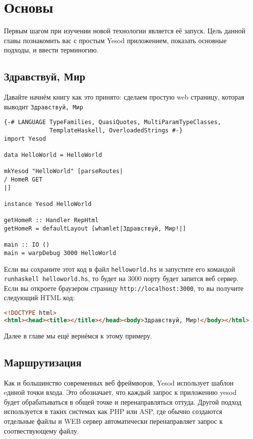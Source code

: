 \section{Основы}

Первым шагом при изучении новой технологии является её запуск. Цель данной главы 
познакомить вас с простым Yesod приложением, показать основные подходы, и ввести
терминогию.

\subsection{Здравствуй, Мир}

Давайте начнём книгу как это принято: сделаем простую web страницу, которая выводит
\texttt{Здравствуй, Мир}

\begin{lstlisting}
{-# LANGUAGE TypeFamilies, QuasiQuotes, MultiParamTypeClasses,
             TemplateHaskell, OverloadedStrings #-}
import Yesod

data HelloWorld = HelloWorld

mkYesod "HelloWorld" [parseRoutes|
/ HomeR GET
|]

instance Yesod HelloWorld

getHomeR :: Handler RepHtml
getHomeR = defaultLayout [whamlet|Здравствуй, Мир!|]

main :: IO ()
main = warpDebug 3000 HelloWorld
\end{lstlisting}

Если вы сохраните этот код в файл \lstinline'helloworld.hs' и запустите его командой
\lstinline'runhaskell helloworld.hs', то будет на 3000 порту будет запится веб сервер. 
Если вы откроете браузером страницу \lstinline'http://localhost:3000',
то вы получите следующий HTML код:

\begin{lstlisting}[language=HTML]
<!DOCTYPE html>
<html><head><title></title></head><body>Здравствуй, Мир!</body></html>
\end{lstlisting}

Далее в главе мы ещё вернёмся к этому примеру.

\subsection{Маршрутизация}

Как и большинство современных веб фреймворов, Yesod использует шаблон eдиной точки входа. 
Это обозначает, что каждый запрос к приложению yesod будет обрабатываться в общей точке и 
перенаправляться оттуда. Другой подход используется в таких системах как PHP или ASP, 
где обычно создаются отдельные файлы и WEB сервер автоматически перенаправляет запрос 
к соотвествующему файлу.

